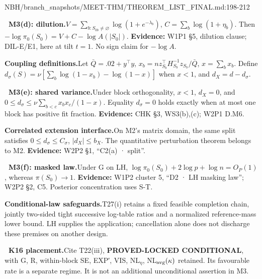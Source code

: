 \begin{stmt}{NBH/branch_snapshots/MEET-THM/THEOREM_LIST_FINAL.md:198-212}
\par\smallskip\noindent\textbf{\ M3(d): dilution.}\enspace \(V=\sum_{b:S_{0b}\ne\varnothing}\log(1+e^{-\lambda_b})\), \(C=\sum_b\log(1+\eta_b)\). Then \(-\log\pi_0(S_0)=V+C-\log A(|S_0|)\). \textbf{Evidence:} W1P1 §5, dilution clause; DIL-E/E1, here at tilt \(t=1\). No sign claim for \(-\log A\).
\par\smallskip\noindent\textbf{Coupling definitions.}\enspace Let \(\bar Q=.02+y^\top y\), \(x_b=nz_{S_b}^\top H_{S_b}^{-1}z_{S_b}/\bar Q\), \(x=\sum_bx_b\). Define \(d_\sigma(S)=\nu[\sum_b\log(1-x_b)-\log(1-x)]\) when \(x<1\), and \(d_X=d-d_\sigma\).
\par\smallskip\noindent\textbf{\ M3(e): shared variance.}\enspace Under block orthogonality, \(x<1\), \(d_X=0\), and \(0\le d_\sigma\le\nu\sum_{b<c}x_bx_c/(1-x)\). Equality \(d_\sigma=0\) holds exactly when at most one block has positive fit fraction. \textbf{Evidence:} CHK §3, WS3(b),(c); W2P1 D.M6.
\par\smallskip\noindent\textbf{Correlated extension interface.}\enspace On M2’s matrix domain, the same split satisfies \(0\le d_\sigma\le C_\sigma\), \(|d_X|\le b_X\). The quantitative perturbation theorem belongs to M2. \textbf{Evidence:} W2P2 §1, “C2(a) · split”.
\par\smallskip\noindent\textbf{\ M3(f): masked law.}\enspace Under G on LH, \(\log\pi_0(S_0)+2\log p+\log n=O_P(1)\), whereas \(\pi(S_0)\to1\). \textbf{Evidence:} W1P2 cluster 5, “D2 · LH masking law”; W2P2 §2, C5. Posterior concentration uses S-T.
\par\smallskip\noindent\textbf{Conditional-law safeguards.}\enspace T27(i) retains a fixed feasible completion chain, jointly two-sided tight successive log-table ratios and a normalized reference-mass lower bound. LH supplies the application; cancellation alone does not discharge these premises on another design.

\par\smallskip\noindent\textbf{\ K16 placement.}\enspace Cite T22(iii), \textbf{PROVED-LOCKED CONDITIONAL}, with G, R, within-block SE, EXP′, VIS, NL\(_\eta\), NL\(_{\rm avg}(\kappa)\) retained. Its favourable rate is a separate regime. It is not an additional unconditional assertion in M3.
\end{stmt}
